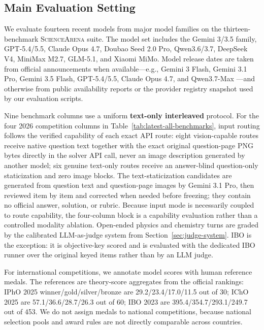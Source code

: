 \documentclass[11pt]{article}
\begin{document}
\subsection{Main Evaluation Setting}
We evaluate fourteen recent models from major model families on the thirteen-benchmark \textsc{ScienceArena} suite.
The model set includes the Gemini 3/3.5 family, GPT-5.4/5.5, Claude Opus 4.7, Doubao Seed 2.0 Pro, Qwen3.6/3.7, DeepSeek V4, MiniMax M2.7, GLM-5.1, and Xiaomi MiMo.
Model release dates are taken from official announcements when available---e.g., Gemini 3 Flash, Gemini 3.1 Pro, Gemini 3.5 Flash, GPT-5.4/5.5, Claude Opus 4.7, and Qwen3.7-Max \citep{google_gemini3flash_release_2025,google_gemini31_release_2026,google_gemini35_release_2026,openai_gpt54_release_2026,openai_gpt55_release_2026,anthropic_opus47_release_2026,qwen37_release_2026}---and otherwise from public availability reports or the provider registry snapshot used by our evaluation scripts.

Nine benchmark columns use a uniform \textbf{text-only interleaved} protocol.
For the four 2026 competition columns in Table~\ref{tab:latest-all-benchmarks}, input routing follows the verified capability of each exact API route: eight vision-capable routes receive native question text together with the exact original question-page PNG bytes directly in the solver API call, never an image description generated by another model; six genuine text-only routes receive an answer-blind question-only staticization and zero image blocks.
The text-staticization candidates are generated from question text and question-page images by Gemini 3.1 Pro, then reviewed item by item and corrected when needed before freezing; they contain no official answer, solution, or rubric. Because input mode is necessarily coupled to route capability, the four-column block is a capability evaluation rather than a controlled modality ablation.
Open-ended physics and chemistry turns are graded by the calibrated LLM-as-judge system from Section~\ref{sec:judge-system}.
IBO is the exception: it is objective-key scored and is evaluated with the dedicated IBO runner over the original keyed items rather than by an LLM judge.

For international competitions, we annotate model scores with human reference medals.
The references are theory-score aggregates from the official rankings: IPhO 2025 winner/gold/silver/bronze are 29.2/23.4/17.0/11.5 out of 30; IChO 2025 are 57.1/36.6/28.7/26.3 out of 60; IBO 2023 are 395.4/354.7/293.1/249.7 out of 453.
We do not assign medals to national competitions, because national selection pools and award rules are not directly comparable across countries.
\end{document}
